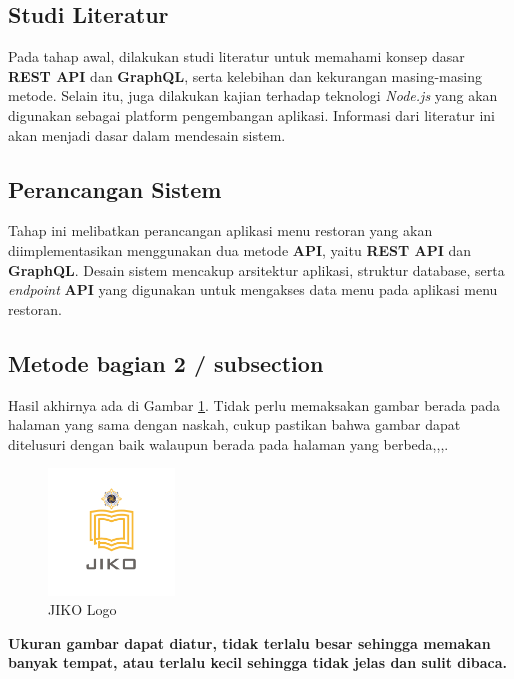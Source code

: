 \documentclass[
 manuscript=article,  %
  layout=publish, 
  year=2024, 
  month= Februari, %
  volume=8,
  number=1 
]{JIKO}
\begin{document}
\subsection{Studi Literatur}

Pada tahap awal, dilakukan studi literatur untuk memahami konsep dasar \textbf{REST API} dan \textbf{GraphQL}, serta kelebihan dan kekurangan masing-masing metode. Selain itu, juga dilakukan kajian terhadap teknologi \textit{Node.js} yang akan digunakan sebagai platform pengembangan aplikasi. Informasi dari literatur ini akan menjadi dasar dalam mendesain sistem.

\subsection{Perancangan Sistem}

Tahap ini melibatkan perancangan aplikasi menu restoran yang akan diimplementasikan menggunakan dua metode \textbf{API}, yaitu \textbf{REST API} dan \textbf{GraphQL}. Desain sistem mencakup arsitektur aplikasi, struktur database, serta \textit{endpoint} \textbf{API} yang digunakan untuk mengakses data menu pada aplikasi menu restoran.


\subsection{Metode bagian 2 / subsection}


 Hasil akhirnya ada di Gambar \ref{fig:logo}. Tidak perlu memaksakan gambar berada pada halaman yang sama dengan naskah, cukup pastikan bahwa gambar dapat ditelusuri dengan baik walaupun berada pada halaman yang berbeda\cite{Erwi2015},\cite{Transport},\cite{soil-1-273-2015},\cite{article}.

\begin{figure}[ht!]
  \centering
  \includegraphics[width=0.3\textwidth]{JIKOlogo.png}
  \caption{JIKO Logo}
  \label{fig:logo}
\end{figure}

\textbf{Ukuran gambar dapat diatur, tidak terlalu besar sehingga memakan banyak tempat, atau terlalu kecil sehingga tidak jelas dan sulit dibaca.}
\end{document}
